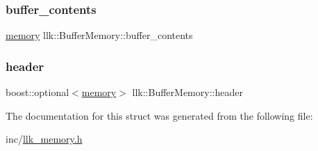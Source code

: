 \subsubsection{\texorpdfstring{buffer\+\_\+contents}{buffer\_contents}}
{\footnotesize\ttfamily \hyperlink{classllk_1_1memory}{memory} llk\+::\+Buffer\+Memory\+::buffer\+\_\+contents}

\mbox{\label{structllk_1_1BufferMemory_a1d36015b797463afc7527cbb22f5a31e}} 
\subsubsection{\texorpdfstring{header}{header}}
{\footnotesize\ttfamily boost\+::optional$<$\hyperlink{classllk_1_1memory}{memory}$>$ llk\+::\+Buffer\+Memory\+::header}



The documentation for this struct was generated from the following file\+:\begin{DoxyCompactItemize}
\item 
inc/\hyperlink{llk__memory_8h}{llk\+\_\+memory.\+h}\end{DoxyCompactItemize}
